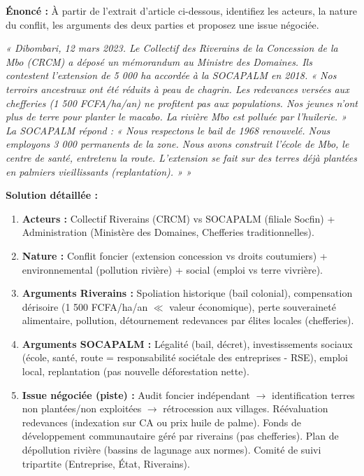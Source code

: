 \documentclass[11pt]{article}
\newcommand{\cle}[1]{{\popxbold\color{popdark}#1}}
\begin{document}
\begin{exoresolu}
\textbf{Énoncé :} À partir de l'extrait d'article ci-dessous, identifiez les acteurs, la nature du conflit, les arguments des deux parties et proposez une issue négociée.

\textit{« Dibombari, 12 mars 2023. Le Collectif des Riverains de la Concession de la Mbo (CRCM) a déposé un mémorandum au Ministre des Domaines. Ils contestent l'extension de 5 000 ha accordée à la SOCAPALM en 2018. « Nos terroirs ancestraux ont été réduits à peau de chagrin. Les redevances versées aux chefferies (1 500 FCFA/ha/an) ne profitent pas aux populations. Nos jeunes n'ont plus de terre pour planter le macabo. La rivière Mbo est polluée par l'huilerie. » La SOCAPALM répond : « Nous respectons le bail de 1968 renouvelé. Nous employons 3 000 permanents de la zone. Nous avons construit l'école de Mbo, le centre de santé, entretenu la route. L'extension se fait sur des terres déjà plantées en palmiers vieillissants (replantation). » »}

\tcblower
\textbf{Solution détaillée :}
\begin{enumerate}
    \item \textbf{Acteurs :} Collectif Riverains (CRCM) vs SOCAPALM (filiale Socfin) + Administration (Ministère des Domaines, Chefferies traditionnelles).
    \item \textbf{Nature :} Conflit foncier (extension concession vs droits coutumiers) + environnemental (pollution rivière) + social (emploi vs terre vivrière).
    \item \textbf{Arguments Riverains :} Spoliation historique (bail colonial), compensation dérisoire (1 500 FCFA/ha/an $\ll$ valeur économique), perte souveraineté alimentaire, pollution, détournement redevances par élites locales (chefferies).
    \item \textbf{Arguments SOCAPALM :} Légalité (bail, décret), investissements sociaux (école, santé, route = \cle{responsabilité sociétale des entreprises - RSE}), emploi local, replantation (pas nouvelle déforestation nette).
    \item \textbf{Issue négociée (piste) :} Audit foncier indépendant $\rightarrow$ identification terres non plantées/non exploitées $\rightarrow$ rétrocession aux villages. Réévaluation redevances (indexation sur CA ou prix huile de palme). Fonds de développement communautaire géré par riverains (pas chefferies). Plan de dépollution rivière (bassins de lagunage aux normes). Comité de suivi tripartite (Entreprise, État, Riverains).
\end{enumerate}
\end{exoresolu}
\end{document}

